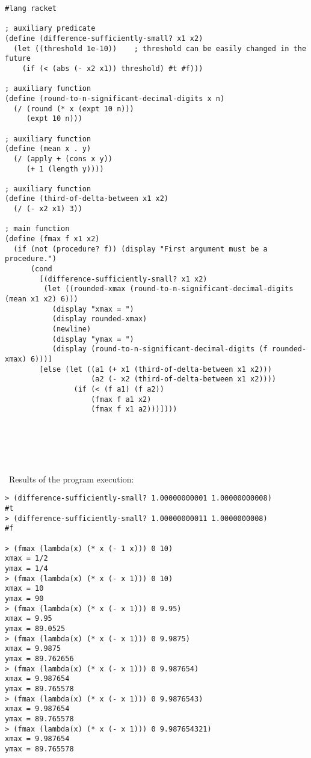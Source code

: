 \documentclass{article}
\begin{document}
\begin{verbatim}
#lang racket

; auxiliary predicate
(define (difference-sufficiently-small? x1 x2)
  (let ((threshold 1e-10))    ; threshold can be easily changed in the future
    (if (< (abs (- x2 x1)) threshold) #t #f)))

; auxiliary function
(define (round-to-n-significant-decimal-digits x n)
  (/ (round (* x (expt 10 n)))
     (expt 10 n)))

; auxiliary function
(define (mean x . y)
  (/ (apply + (cons x y))
     (+ 1 (length y))))

; auxiliary function
(define (third-of-delta-between x1 x2)
  (/ (- x2 x1) 3))

; main function
(define (fmax f x1 x2)
  (if (not (procedure? f)) (display "First argument must be a procedure.")
      (cond
        [(difference-sufficiently-small? x1 x2)
         (let ((rounded-xmax (round-to-n-significant-decimal-digits (mean x1 x2) 6)))
           (display "xmax = ")
           (display rounded-xmax)
           (newline)
           (display "ymax = ")
           (display (round-to-n-significant-decimal-digits (f rounded-xmax) 6)))]
        [else (let ((a1 (+ x1 (third-of-delta-between x1 x2)))
                    (a2 (- x2 (third-of-delta-between x1 x2))))
                (if (< (f a1) (f a2))
                    (fmax f a1 x2)
                    (fmax f x1 a2)))])))
\end{verbatim}

\paragraph{}\
\paragraph{}\
\paragraph{}\
	Results of the program execution:
	
\begin{verbatim} 
> (difference-sufficiently-small? 1.00000000001 1.00000000008)
#t
> (difference-sufficiently-small? 1.00000000011 1.0000000008)
#f

> (fmax (lambda(x) (* x (- 1 x))) 0 10)
xmax = 1/2
ymax = 1/4
> (fmax (lambda(x) (* x (- x 1))) 0 10)
xmax = 10
ymax = 90
> (fmax (lambda(x) (* x (- x 1))) 0 9.95)
xmax = 9.95
ymax = 89.0525
> (fmax (lambda(x) (* x (- x 1))) 0 9.9875)
xmax = 9.9875
ymax = 89.762656
> (fmax (lambda(x) (* x (- x 1))) 0 9.987654)
xmax = 9.987654
ymax = 89.765578
> (fmax (lambda(x) (* x (- x 1))) 0 9.9876543)
xmax = 9.987654
ymax = 89.765578
> (fmax (lambda(x) (* x (- x 1))) 0 9.987654321)
xmax = 9.987654
ymax = 89.765578
\end{verbatim}
\end{document}
